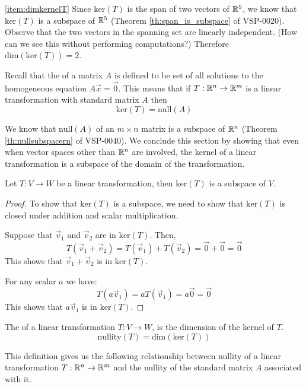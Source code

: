 \documentclass{ximera}
\begin{document}
\begin{example}
\begin{explanation}
\ref{item:dimkernelT}  Since $\mbox{ker}(T)$ is the span of two vectors of $\mathbb{R}^5$, we know that $\mbox{ker}(T)$ is a subspace of $\mathbb{R}^5$ (Theorem \ref{th:span_is_subspace} of VSP-0020).  Observe that the two vectors in the spanning set are linearly independent. (How can we see this without performing computations?)  Therefore $\mbox{dim}(\mbox{ker}(T))=2$.
\end{explanation}
\end{example}


Recall that the  of a matrix $A$ is defined to be set of all solutions to the homogeneous equation $A\vec{x}=\vec{0}$. This means that  if $T:\mathbb{R}^n\rightarrow \mathbb{R}^m$ is a linear transformation with standard matrix $A$ then
$$\mbox{ker}(T)=\mbox{null}(A)$$

We know that $\mbox{null}(A)$ of an $m\times n$ matrix is a subspace of $\mathbb{R}^n$ (Theorem \ref{th:nullsubspacern} of VSP-0040).  We conclude this section by showing that even when vector spaces other than $\mathbb{R}^n$ are involved, the kernel of a linear transformation is a subspace of the domain of the transformation.
\begin{theorem}\label{th:kersubspace} Let $T:V\rightarrow W$ be a linear transformation, then $\mbox{ker}(T)$ is a subspace of $V$.
\end{theorem}
\begin{proof}
To show that $\mbox{ker}(T)$ is a subspace, we need to show that $\mbox{ker}(T)$ is closed under addition and scalar multiplication.

Suppose that $\vec{v}_1$ and $\vec{v}_2$ are in $\mbox{ker}(T)$.  Then,
$$T(\vec{v}_1+\vec{v}_2)=T(\vec{v}_1)+T(\vec{v}_2)=\vec{0}+\vec{0}=\vec{0}$$
This shows that $\vec{v}_1+\vec{v}_2$ is in $\mbox{ker}(T)$.

For any scalar $a$ we have:
$$T(a\vec{v}_1)=aT(\vec{v}_1)=a\vec{0}=\vec{0}$$
This shows that $a\vec{v}_1$ is in $\mbox{ker}(T)$.

\end{proof}



\begin{definition}\label{def:nullityT}
The  of a linear transformation $T:V\rightarrow W$, is the dimension of the kernel of $T$.
$$\mbox{nullity}(T)=\mbox{dim}(\mbox{ker}(T))$$
\end{definition}

This definition gives us the following relationship between nullity of a linear transformation $T:\mathbb{R}^n\rightarrow\mathbb{R}^m$ and the nullity of the standard matrix $A$ associated with it.
\end{document}
